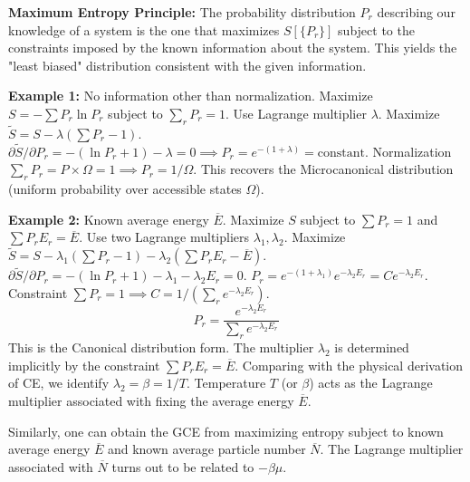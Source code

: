 \documentclass[11pt]{article}
\newcommand{\avg}[1]{\overline{#1}}
\begin{document}
\textbf{Maximum Entropy Principle:} The probability distribution $P_r$ describing our knowledge of a system is the one that maximizes $S[\{P_r\}]$ subject to the constraints imposed by the known information about the system. This yields the "least biased" distribution consistent with the given information.

\textbf{Example 1:} No information other than normalization.
Maximize $S = -\sum P_r \ln P_r$ subject to $\sum_r P_r = 1$.
Use Lagrange multiplier $\lambda$. Maximize $\tilde{S} = S - \lambda(\sum P_r - 1)$.
$\partial \tilde{S} / \partial P_r = -(\ln P_r + 1) - \lambda = 0 \implies P_r = e^{-(1+\lambda)} = \text{constant}$.
Normalization $\sum_r P_r = P \times \Omega = 1 \implies P_r = 1/\Omega$.
This recovers the Microcanonical distribution (uniform probability over accessible states $\Omega$).

\textbf{Example 2:} Known average energy $\avg{E}$.
Maximize $S$ subject to $\sum P_r = 1$ and $\sum P_r E_r = \avg{E}$.
Use two Lagrange multipliers $\lambda_1, \lambda_2$. Maximize $\tilde{S} = S - \lambda_1(\sum P_r - 1) - \lambda_2(\sum P_r E_r - \avg{E})$.
$\partial \tilde{S} / \partial P_r = -(\ln P_r + 1) - \lambda_1 - \lambda_2 E_r = 0$.
$P_r = e^{-(1+\lambda_1)} e^{-\lambda_2 E_r} = C e^{-\lambda_2 E_r}$.
Constraint $\sum P_r = 1 \implies C = 1 / (\sum_r e^{-\lambda_2 E_r})$.
\[ P_r = \frac{e^{-\lambda_2 E_r}}{\sum_r e^{-\lambda_2 E_r}} \]
This is the Canonical distribution form. The multiplier $\lambda_2$ is determined implicitly by the constraint $\sum P_r E_r = \avg{E}$. Comparing with the physical derivation of CE, we identify $\lambda_2 = \beta = 1/T$. Temperature $T$ (or $\beta$) acts as the Lagrange multiplier associated with fixing the average energy $\avg{E}$.

Similarly, one can obtain the GCE from maximizing entropy subject to known average energy $\avg{E}$ and known average particle number $\avg{N}$. The Lagrange multiplier associated with $\avg{N}$ turns out to be related to $-\beta \mu$.
\end{document}
